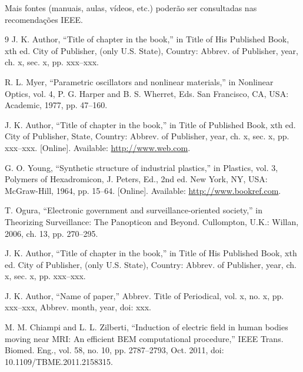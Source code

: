 \documentclass[a4paper,twoside,11pt]{report}
\makeatletter
\def\cleardoublepage{\clearpage\if@twoside \ifodd\c@page\else
    \hbox{}
    \vspace*{\fill}
    \vspace{\fill}
    \thispagestyle{empty}
    \newpage
    \if@twocolumn\hbox{}\newpage\fi\fi\fi}
\makeatother
\begin{document}
Mais fontes (manuais, aulas, vídeos, etc.) poderão ser consultadas nas recomendações IEEE.










\clearpage



\begin{thebibliography}{9}
J. K. Author, “Title of chapter in the book,” in Title of His Published Book, xth ed. City of Publisher, (only U.S. State), Country: Abbrev. of Publisher, year, ch. x, sec. x, pp. xxx–xxx.

R. L. Myer, “Parametric oscillators and nonlinear materials,” in Nonlinear Optics, vol. 4, P. G. Harper and B. S. Wherret, Eds. San Francisco, CA, USA: Academic, 1977, pp. 47–160.

J. K. Author, “Title of chapter in the book,” in Title of Published Book, xth ed. City of Publisher, State, Country: Abbrev. of Publisher, year, ch. x, sec. x, pp. xxx–xxx. [Online]. Available: \url{http://www.web.com}.

G. O. Young, “Synthetic structure of industrial plastics,” in Plastics, vol. 3, Polymers of Hexadromicon, J. Peters, Ed., 2nd ed. New York, NY, USA: McGraw-Hill, 1964, pp. 15–64. [Online]. Available: \url{http://www.bookref.com}.

T. Ogura, “Electronic government and surveillance-oriented society,” in Theorizing Surveillance: The Panopticon and Beyond. Cullompton, U.K.: Willan, 2006, ch. 13, pp. 270–295.

J. K. Author, “Title of chapter in the book,” in Title of His Published Book, xth ed. City of Publisher, (only U.S. State), Country: Abbrev. of Publisher, year, ch. x, sec. x, pp. xxx–xxx.

J. K. Author, “Name of paper,” Abbrev. Title of Periodical, vol. x, no. x, pp. xxx–xxx, Abbrev. month, year, doi: xxx. 

M. M. Chiampi and L. L. Zilberti, “Induction of electric field in human bodies moving near MRI: An efficient BEM computational procedure,” IEEE Trans. Biomed. Eng., vol. 58, no. 10, pp. 2787–2793, Oct. 2011, doi: 10.1109/TBME.2011.2158315.


\end{thebibliography}
\end{document}
